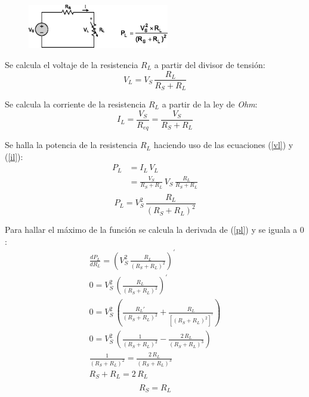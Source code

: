 \documentclass[letter,11pt]{article}
\begin{document}
\begin{enumerate}
\begin{figure}[!h]
\centering
\includegraphics[width=0.55\textwidth]{resources/figura1.eps}
\end{figure}

Se calcula el voltaje de la resistencia $R_L$ a partir del divisor de tensión:
\begin{equation}
    V_L = V_S\,\frac{R_L}{R_S + R_L}
    \label{vl}
\end{equation}

Se calcula la corriente de la resistencia $R_L$ a partir de la ley de
\emph{Ohm}:
\begin{equation}
    I_L = \frac{V_S}{R_{eq}} = \frac{V_S}{R_S + R_L}
    \label{il}
\end{equation}

Se halla la potencia de la resistencia $R_L$ haciendo uso de las ecuaciones
(\ref{vl}) y (\ref{il}):
\begin{equation*}
    \begin{split}
        P_L &= I_L\,V_L \\
            &= \frac{V_S}{R_S + R_L}\,V_S\,\frac{R_L}{R_S + R_L} \\
    \end{split}
\end{equation*}
\begin{equation}
    P_L = V_S^2\,\frac{R_L}{(R_S + R_L)^2}
    \label{pl}
\end{equation}

Para hallar el máximo de la función se calcula la derivada de (\ref{pl}) y se
iguala a $0$:
\begin{equation*}
    \begin{split}
        \frac{dP_L}{dR_L} = \left(V_S^2\,\frac{R_L}{(R_S + R_L)^2}\right)^{'} \\
            0 = V_S^2\,\left(\frac{R_L}{(R_S + R_L)^2}\right)^{'} \\
            0 = V_S^2\,\left(\frac{R_L'}{(R_S + R_L)^2} + \frac{R_L}{[(R_S + R_L)^2]^{'}}\right) \\
            0 = V_S^2\,\left(\frac{1}{(R_S + R_L)^2} - \frac{2\,R_L}{(R_S + R_L)^3}\right) \\
            \frac{1}{(R_S + R_L)^2} = \frac{2\,R_L}{(R_S + R_L)^3} \\
            R_S + R_L = 2\,R_L \\
    \end{split}
\end{equation*}
\begin{equation}
    R_S = R_L
    \label{rl}
\end{equation}


\end{enumerate}
\end{document}
